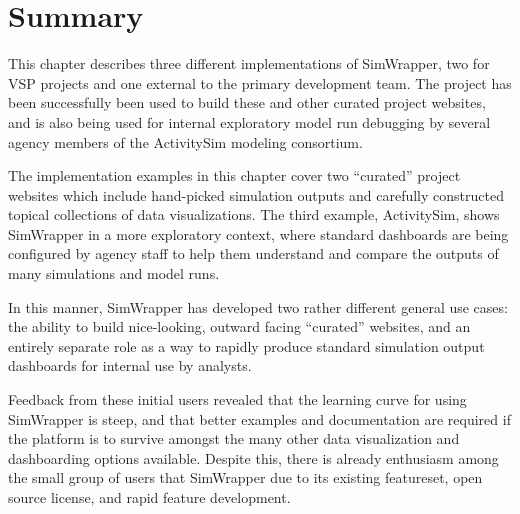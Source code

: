 \section{Summary}
\label{sites-summary}

This chapter describes three different implementations of SimWrapper, two for VSP projects and one external to the primary development team. The project has been successfully been used to build these and other curated project websites, and is also being used for internal exploratory model run debugging by several agency members of the ActivitySim modeling consortium.

The implementation examples in this chapter cover two ``curated'' project websites which include hand-picked simulation outputs and carefully constructed topical collections of data visualizations. The third example, ActivitySim, shows SimWrapper in a more exploratory context, where standard dashboards are being configured by agency staff to help them understand and compare the outputs of many simulations and model runs.

In this manner, SimWrapper has developed two rather different general use cases: the ability to build nice-looking, outward facing ``curated'' websites, and an entirely separate role as a way to rapidly produce standard simulation output dashboards for internal use by analysts.

Feedback from these initial users revealed that the learning curve for using SimWrapper is steep, and that better examples and documentation are required if the platform is to survive amongst the many other data visualization and dashboarding options available. Despite this, there is already enthusiasm among the small group of users that SimWrapper due to its existing featureset, open source license, and rapid feature development.



